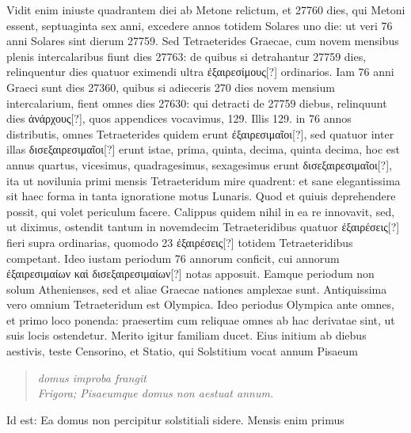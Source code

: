 %
Vidit enim iniuste quadrantem diei ab Metone relictum, et
27760 dies, qui Metoni essent, septuaginta sex anni, excedere annos
totidem Solares uno die: ut veri 76 anni Solares sint dierum 27759.
Sed  Tetraeterides Graecae, cum novem mensibus
 plenis intercalaribus
fiunt dies 27763: de quibus si detrahantur 27759 dies, relinquentur
dies quatuor eximendi ultra  \textgreek{ἐξαιρεσίμους[?]}
 ordinarios.
Iam
76 anni Graeci sunt dies 27360, quibus si adieceris 270 dies novem
mensium intercalarium, fient omnes dies 27630: qui detracti de
27759 diebus, relinquunt dies \textgreek{ἀνάρχους[?]},
 quos appendices vocavimus,
129.
Illis 129. in 76 annos distributis, omnes 
 Tetraeterides quidem
erunt \textgreek{ἐξαιρεσιμαῖοι[?]}, sed quatuor inter illas
 \textgreek{δισεξαιρεσιμαῖοι[?]} erunt istae,
prima, quinta, decima, quinta decima, hoc est annus quartus, vicesimus,
quadragesimus, sexagesimus erunt \textgreek{δισεξαιρεσιμαῖοι[?]},
 ita ut novilunia primi
mensis Tetraeteridum mire quadrent: et sane elegantissima sit haec
forma in tanta ignoratione motus Lunaris.
Quod et quiuis deprehendere
possit, qui volet periculum facere.
Calippus quidem nihil in
ea re innovavit, sed, ut diximus, ostendit tantum in novemdecim Tetraeteridibus
quatuor \textgreek{ἐξαιρέσεις[?]} fieri supra  ordinarias,
 quomodo 23
\textgreek{ἐξαιρέσεις[?]} totidem Tetraeteridibus competant.
Ideo iustam periodum
76 annorum conficit, cui annorum
 \textgreek{ἐξαιρεσιμαίων καὶ δισεξαιρεσιμαίων[?]} notas
apposuit.
Eamque periodum non solum Athenienses, sed et aliae
Graecae nationes amplexae sunt.
Antiquissima vero omnium Tetraeteridum
est Olympica.
Ideo periodus Olympica ante omnes, et primo
loco ponenda: praesertim cum reliquae omnes ab hac derivatae sint, ut
suis locis ostendetur.
Merito igitur familiam ducet.
Eius initium ab diebus
aestivis, teste Censorino, et Statio, qui Solstitium vocat annum
Pisaeum
\begin{verse}
\textit{\emd{} domus improba frangit}\\
\textit{Frigora; Pisaeumque domus non aestuat annum.}
\end{verse}
Id est: Ea domus non percipitur solstitiali sidere.
Mensis enim primus
